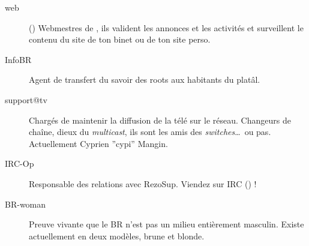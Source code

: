 \begin{description}

  \item[web] {() Webmestres de \fkz, ils valident les annonces et les activit\'es et surveillent le contenu du site de ton binet ou de ton site perso.}


  \item[InfoBR]{Agent de transfert du savoir des roots aux habitants du plat\^al.}

  \item[support@tv]{Charg\'es de maintenir la diffusion de la t\'el\'e sur le r\'eseau. Changeurs de cha\^ine, dieux du \emph{multicast}, ils sont les amis des \emph{switches}\dots\ ou pas. Actuellement Cyprien ''cypi'' Mangin.}


  \item[IRC-Op]{Responsable des relations avec RezoSup. Viendez sur IRC () !}


  \item[BR-woman]{Preuve vivante que le BR n'est pas un milieu enti\`erement masculin. Existe actuellement en deux modèles, brune et blonde.}

\end{description}

